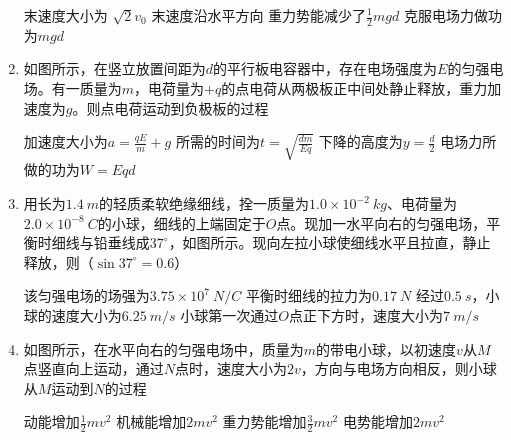 \begin{enumerate}[leftmargin=0em]
\fourchoices
{末速度大小为 $ \sqrt{2}v_{0} $}
{末速度沿水平方向}
{重力势能减少了$ \frac{ 1 }{ 2 } mgd $}
{克服电场力做功为$ mgd $ }





\item
{}
如图所示，在竖立放置间距为$ d $的平行板电容器中，存在电场强度为$ E $的匀强电场。有一质量为$ m $，电荷量为$ +q $的点电荷从两极板正中间处静止释放，重力加速度为$ g $。则点电荷运动到负极板的过程  
\begin{figure}[h!]
\centering

\end{figure}



\fourchoices
{ 加速度大小为$a = \frac { q E } { m } + g$}
{所需的时间为$t = \sqrt { \frac { d m } { E q } }$}
{下降的高度为$y = \frac { d } { 2 }$}
{电场力所做的功为$ W=Eqd $}





\item
{}
用长为$ 1.4 \ m $的轻质柔软绝缘细线，拴一质量为$ 1.0 \times 10^{-2} \ kg $、电荷量为$ 2.0 \times 10^{-8} \ C $的小球，细线的上端固定于$ O $点。现加一水平向右的匀强电场，平衡时细线与铅垂线成$ 37 ^{\circ} $，如图所示。现向左拉小球使细线水平且拉直，静止释放，则（$ \sin 37 ^{\circ} =0.6 $）  
\begin{figure}[h!]
\centering

\end{figure}



\fourchoices
{该匀强电场的场强为$ 3.75 \times 10^7 \ N/C $}
{平衡时细线的拉力为$ 0.17 \ N $}
{ 经过$ 0.5 \ s $，小球的速度大小为$ 6.25 \ m/s $}
{小球第一次通过$ O $点正下方时，速度大小为$ 7 \ m/s $}




\item
{}
如图所示，在水平向右的匀强电场中，质量为$ m $的带电小球，以初速度$ v $从$ M $点竖直向上运动，通过$ N $点时，速度大小为$ 2v $，方向与电场方向相反，则小球从$ M $运动到$ N $的过程  
\begin{figure}[h!]
\centering

\end{figure}




\fourchoices
{动能增加$ \frac{ 1 }{ 2 } mv^{2} $}
{机械能增加$ 2mv^{2} $}
{重力势能增加$ \frac{ 3 }{ 2 } mv^{2} $}
{电势能增加$ 2mv^{2} $}





\end{enumerate}
